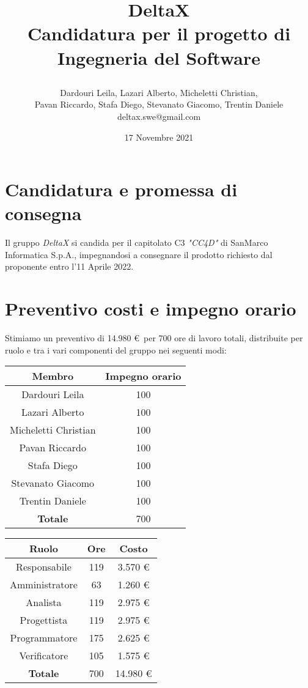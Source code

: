 \documentclass[12pt]{article}
\title{
\vspace{-3cm}
\begin{figure}[h]
  \centering
  
\end{figure}
\vspace{-0.5cm}
DeltaX \\
\vspace{0.3cm}
Candidatura per il progetto di Ingegneria del Software
}
\author{
Dardouri Leila, Lazari Alberto, Micheletti Christian, \\
Pavan Riccardo, Stafa Diego, Stevanato Giacomo, Trentin Daniele \vspace{0.4cm}\\
deltax.swe@gmail.com
}
\date{17 Novembre 2021}
\begin{document}
\maketitle

\section*{Candidatura e promessa di consegna}

Il gruppo \textit{DeltaX} si candida per il capitolato C3 \textit{"CC4D"} di SanMarco Informatica S.p.A., impegnandosi a consegnare il prodotto richiesto dal proponente entro l'11 Aprile 2022. 

\section*{Preventivo costi e impegno orario}

Stimiamo un preventivo di 14.980 \euro \ per 700 ore di lavoro totali, distribuite per ruolo e tra i vari componenti del gruppo nei seguenti modi:

\begin{table}[h]
    \centering
    \begin{tabular}{|c|c|}
        \hline
        \textbf{Membro} & \textbf{Impegno orario} \\
        \hline
        Dardouri Leila       & 100 \\
        Lazari Alberto       & 100 \\
        Micheletti Christian & 100 \\
        Pavan Riccardo       & 100 \\
        Stafa Diego          & 100 \\
        Stevanato Giacomo    & 100 \\
        Trentin Daniele      & 100 \\
        \hline
        \textbf{Totale} & 700 \\
        \hline
    \end{tabular}
    \quad\quad\quad\quad\quad
    \begin{tabular}{|c|c|c|}
        \hline
        \textbf{Ruolo} & \textbf{Ore} & \textbf{Costo} \\
        \hline
        Responsabile    & 119 & 3.570 \euro \\
        Amministratore  &  63 & 1.260 \euro \\
        Analista        & 119 & 2.975 \euro \\
        Progettista     & 119 & 2.975 \euro \\
        Programmatore   & 175 & 2.625 \euro \\
        Verificatore    & 105 & 1.575 \euro \\
        \hline
        \textbf{Totale} & 700 & 14.980 \euro \\
        \hline
    \end{tabular}
\end{table}
\end{document}
